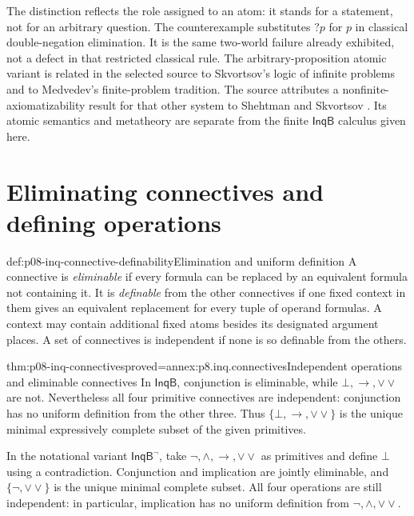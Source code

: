 The distinction reflects the role assigned to an atom: it stands for a
statement, not for an arbitrary question. The counterexample substitutes
\(?p\) for \(p\) in classical double-negation elimination. It is the
same two-world failure already exhibited, not a defect in that restricted
classical rule.
The arbitrary-proposition atomic variant is related in the selected source
to Skvortsov's logic of infinite problems and to Medvedev's finite-problem
tradition. The source attributes a nonfinite-axiomatizability result for
that other system to Shehtman and Skvortsov
\cite[Section~3.8]{Ciardelli2023InquisitivePropositional}.
Its atomic semantics and metatheory are separate from the finite
\(\mathsf{InqB}\) calculus given here.

\section{Eliminating connectives and defining operations}

\begin{hbdefinition}{def:p08-inq-connective-definability}{Elimination and uniform definition}
A connective is \emph{eliminable} if every formula can be replaced by an
equivalent formula not containing it. It is \emph{definable} from the other
connectives if one fixed context in them gives an equivalent replacement
for every tuple of operand formulas. A context may contain additional fixed
atoms besides its designated argument places. A set of connectives is
independent if none is so definable from the others.
\end{hbdefinition}

\begin{hbtheorem}{thm:p08-inq-connectives}{proved=annex:p8.inq.connectives}{Independent operations and eliminable connectives}
In \(\mathsf{InqB}\), conjunction is eliminable, while
\(\bot,\to,\mathbin{\vee\!\vee}\) are not. Nevertheless all four primitive
connectives are independent: conjunction has no uniform definition from
the other three. Thus \(\{\bot,\to,\mathbin{\vee\!\vee}\}\) is the unique
minimal expressively complete subset of the given primitives.

In the notational variant \(\mathsf{InqB}^{\neg}\), take
\(\neg,\land,\to,\mathbin{\vee\!\vee}\) as primitives and define
\(\bot\) using a contradiction. Conjunction and implication are jointly
eliminable, and \(\{\neg,\mathbin{\vee\!\vee}\}\) is the unique minimal
complete subset. All four operations are still independent: in particular,
implication has no uniform definition from
\(\neg,\land,\mathbin{\vee\!\vee}\).
\end{hbtheorem}

